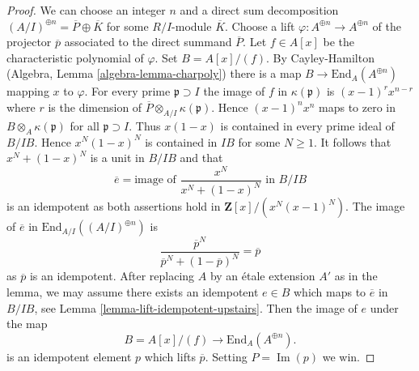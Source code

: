\documentclass[10pt,a4paper]{amsart}
\theoremstyle{plain}
\theoremstyle{definition}
\theoremstyle{remark}
\numberwithin{equation}{subsection}
\def\Im{\mathop{\mathrm{Im}}}
\begin{document}
\begin{proof}
We can choose an integer $n$ and a direct sum decomposition
$(A/I)^{\oplus n} = \overline{P} \oplus \overline{K}$
for some $R/I$-module $\overline{K}$. Choose a lift
$\varphi : A^{\oplus n} \to A^{\oplus n}$ of the projector $\overline{p}$
associated to the direct summand $\overline{P}$.
Let $f \in A[x]$ be the characteristic polynomial of $\varphi$.
Set $B = A[x]/(f)$. By Cayley-Hamilton
(Algebra, Lemma \ref{algebra-lemma-charpoly}) there is a map
$B \to \text{End}_A(A^{\oplus n})$ mapping $x$ to $\varphi$.
For every prime $\mathfrak p \supset I$ the image of $f$ in
$\kappa(\mathfrak p)$ is $(x - 1)^rx^{n - r}$ where $r$ is the
dimension of $\overline{P} \otimes_{A/I} \kappa(\mathfrak p)$.
Hence $(x - 1)^nx^n$ maps to zero in $B \otimes_A \kappa(\mathfrak p)$
for all $\mathfrak p \supset I$. Thus $x(1 - x)$ is contained
in every prime ideal of $B/IB$. Hence $x^N(1 - x)^N$ is
contained in $IB$ for some $N \geq 1$.
It follows that $x^N + (1 - x)^N$ is a unit in $B/IB$ and that
$$
\overline{e} = \text{image of }\frac{x^N}{x^N + (1 - x)^N}\text{ in }B/IB
$$
is an idempotent as both assertions hold in $\mathbf{Z}[x]/(x^N(x - 1)^N)$.
The image of $\overline{e}$ in $\text{End}_{A/I}((A/I)^{\oplus n})$ is
$$
\frac{\overline{p}^N}{\overline{p}^N + (1 - \overline{p})^N} = \overline{p}
$$
as $\overline{p}$ is an idempotent. After replacing $A$ by an \'etale
extension $A'$ as in the lemma, we may assume there exists an idempotent
$e \in B$ which maps to $\overline{e}$ in $B/IB$, see
Lemma \ref{lemma-lift-idempotent-upstairs}.
Then the image of $e$ under the map
$$
B = A[x]/(f) \longrightarrow \text{End}_A(A^{\oplus n}).
$$
is an idempotent element $p$ which lifts $\overline{p}$.
Setting $P = \Im(p)$ we win.
\end{proof}
\end{document}
